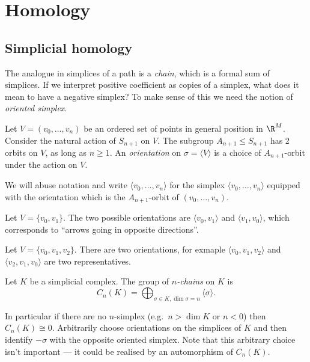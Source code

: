 \documentclass[a4paper]{article}
\begin{document}
\section{Homology}

\subsection{Simplicial homology}

The analogue in simplices of a path is a \emph{chain}, which is a formal sum of simplices. If we interpret positive coefficient as copies of a simplex, what does it mean to have a negative simplex? To make sense of this we need the notion of \emph{oriented simplex}.

\begin{definition}[orientation]
  Let \(V = (v_0, \dots, v_n)\) be an ordered set of points in general position in \(\R^M\). Consider the natural action of \(S_{n + 1}\) on \(V\). The subgroup \(A_{n + 1} \leq S_{n + 1}\) has 2 orbits on \(V\), as long as \(n \geq 1\). An \emph{orientation} on \(\sigma = \langle V \rangle\) is a choice of \(A_{n + 1}\)-orbit under the action on \(V\).

  We will abuse notation and write \(\langle v_0, \dots, v_n \rangle\) for the simplex \(\langle v_0, \dots, v_n \rangle\) equipped with the orientation which is the \(A_{n + 1}\)-orbit of \((v_0, \dots, v_n)\).
\end{definition}

\begin{eg}
  Let \(V = \{v_0, v_1\}\). The two possible orientations are \(\langle v_0, v_1 \rangle\) and \(\langle v_1, v_0\rangle\), which corresponds to ``arrows going in opposite directions''.
\end{eg}

\begin{eg}
  Let \(V = \{v_0, v_1, v_2\}\). There are two orientations, for exmaple \(\langle v_0, v_1, v_2 \rangle\) and \(\langle v_2, v_1, v_0 \rangle\) are two representatives.
\end{eg}

\begin{definition}[chain]
  Let \(K\) be a simplicial complex. The group of \emph{\(n\)-chains} on \(K\) is
  \[
    C_n(K) = \bigoplus_{\sigma \in K, \dim \sigma = n} \langle \sigma \rangle.
  \]
\end{definition}

In particular if there are no \(n\)-simplex (e.g.\ \(n > \dim K\) or \(n < 0\)) then \(C_n(K) \cong 0\). Arbitrarily choose orientations on the simplices of \(K\) and then identify \(-\sigma\) with the opposite oriented simplex. Note that this arbitrary choice isn't important --- it could be realised by an automorphism of \(C_n(K)\).
\end{document}
